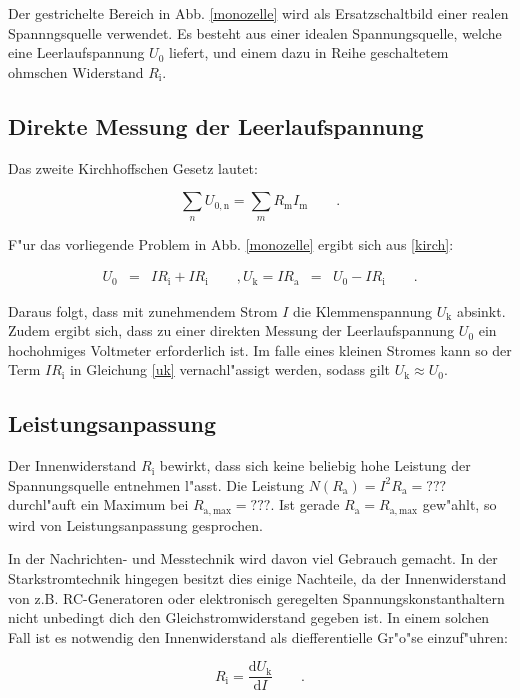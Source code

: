 Der gestrichelte Bereich in Abb. \ref{monozelle} wird als Ersatzschaltbild einer realen Spannngsquelle verwendet.
Es besteht aus einer idealen Spannungsquelle, welche eine Leerlaufspannung $U_\mathrm{0}$ liefert, und einem dazu in Reihe geschaltetem ohmschen Widerstand $R_\mathrm{i}$.

\subsection{Direkte Messung der Leerlaufspannung} %
\label{sub:direkte_messung_der_leerlaufspannung}

Das zweite Kirchhoffschen Gesetz lautet:

\begin{equation}
	\sum_n U_\mathrm{0,n} = \sum_m R_\mathrm{m} I_\mathrm{m} \qquad . \label{kirch}
\end{equation}

F"ur das vorliegende Problem in Abb. \ref{monozelle} ergibt sich aus \eqref{kirch}:

\begin{eqnarray}
	U_\mathrm{0} &=& I R_\mathrm{i} + I R_\mathrm{i} \qquad , \nonumber
	U_\mathrm{k} = I R_\mathrm{a} &=& U_\mathrm{0} - I R_\mathrm{i} \qquad . \label{uk}
\end{eqnarray}

Daraus folgt, dass mit zunehmendem Strom $I$ die Klemmenspannung $U_\mathrm{k}$ absinkt.
Zudem ergibt sich, dass zu einer direkten Messung der Leerlaufspannung $U_\mathrm{0}$ ein hochohmiges Voltmeter erforderlich ist. Im falle eines kleinen Stromes kann so der Term $I R_\mathrm{i}$ in Gleichung \eqref{uk} vernachl"assigt werden, sodass gilt $U_\mathrm{k} \approx U_\mathrm{0}$.

\subsection{Leistungsanpassung} %
\label{sub:leistungsanpassung}

Der Innenwiderstand $R_\mathrm{i}$ bewirkt, dass sich keine beliebig hohe Leistung der Spannungsquelle entnehmen l"asst.
Die Leistung $N(R_\mathrm{a}) = I^2 R_\mathrm{a} = ???$ durchl"auft ein Maximum bei $R_\mathrm{a,max} = ???$.
Ist gerade $R_\mathrm{a} = R_\mathrm{a,max}$ gew"ahlt, so wird von Leistungsanpassung gesprochen.

In der Nachrichten- und Messtechnik wird davon viel Gebrauch gemacht.
In der Starkstromtechnik hingegen besitzt dies einige Nachteile, da der Innenwiderstand von z.B. RC-Generatoren oder elektronisch geregelten Spannungskonstanthaltern nicht unbedingt dich den Gleichstromwiderstand gegeben ist.
In einem solchen Fall ist es notwendig den Innenwiderstand als diefferentielle Gr"o"se einzuf"uhren:

\begin{equation}
	R_\mathrm{i} = \frac{\mathrm{d}U_\mathrm{k}}{\mathrm{d}I} \qquad .
\end{equation}
